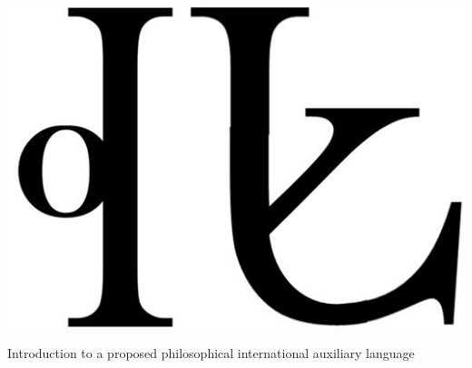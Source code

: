


\thispagestyle{empty}
\setcounter{page}{-1}
\begin{center}
\includegraphics[scale=0.6]{./Images/LogoAtlan.jpeg}

	\hspace{0.7cm}

	{\large \hspace{-0.045cm}Introduction to a proposed philosophical international auxiliary language}
\end{center}
\pagebreak
